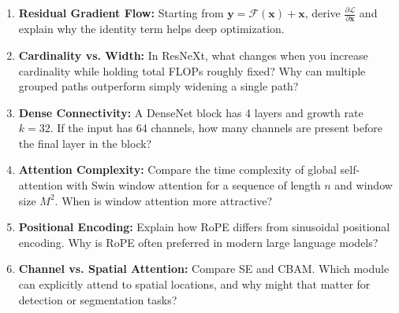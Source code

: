 \begin{enumerate}
    \item \textbf{Residual Gradient Flow:} Starting from $\mathbf{y} = \mathcal{F}(\mathbf{x}) + \mathbf{x}$, derive $\frac{\partial \mathcal{L}}{\partial \mathbf{x}}$ and explain why the identity term helps deep optimization.

    \item \textbf{Cardinality vs. Width:} In ResNeXt, what changes when you increase cardinality while holding total FLOPs roughly fixed? Why can multiple grouped paths outperform simply widening a single path?

    \item \textbf{Dense Connectivity:} A DenseNet block has 4 layers and growth rate $k=32$. If the input has 64 channels, how many channels are present before the final layer in the block?

    \item \textbf{Attention Complexity:} Compare the time complexity of global self-attention with Swin window attention for a sequence of length $n$ and window size $M^2$. When is window attention more attractive?

    \item \textbf{Positional Encoding:} Explain how RoPE differs from sinusoidal positional encoding. Why is RoPE often preferred in modern large language models?

    \item \textbf{Channel vs. Spatial Attention:} Compare SE and CBAM. Which module can explicitly attend to spatial locations, and why might that matter for detection or segmentation tasks?
\end{enumerate}


